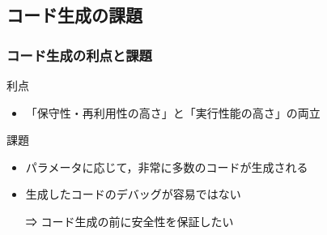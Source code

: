 
\subsection{コード生成の課題}

\begin{frame}
  \frametitle{コード生成の利点と課題}
  利点
  \begin{itemize}
  \item \alert{「保守性・再利用性の高さ」}と\alert{「実行性能の高さ」}の両立
  \end{itemize}

  \pause

  課題
  \begin{itemize}
  \item パラメータに応じて，非常に多数のコードが生成される
  \item 生成したコードのデバッグが容易ではない
  \item [⇒] \alert{コード生成の前に安全性を保証}したい
  \end{itemize}
\end{frame}


